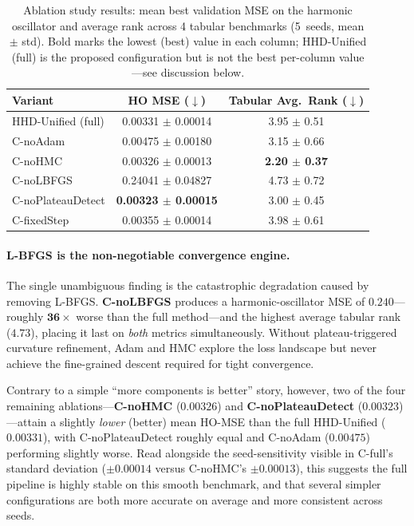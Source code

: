 \documentclass[11pt]{article}
\theoremstyle{definition}
\begin{document}
\begin{table}[H]
\centering
\caption{Ablation study results: mean best validation MSE on the
         harmonic oscillator and average rank across 4 tabular
         benchmarks (5~seeds, mean $\pm$ std).
         Bold marks the lowest (best) value in each column;
         HHD-Unified (full) is the proposed configuration but is not
         the best per-column value---see discussion below.}
\label{tab:ablation}
\renewcommand{\arraystretch}{1.25}
\begin{tabular}{lcc}
\toprule
\textbf{Variant} & \textbf{HO MSE} ($\downarrow$)
                 & \textbf{Tabular Avg.\ Rank} ($\downarrow$) \\
\midrule
HHD-Unified (full)       & 0.00331 $\pm$ 0.00014 & 3.95 $\pm$ 0.51 \\
C-noAdam                & 0.00475 $\pm$ 0.00180 & 3.15 $\pm$ 0.66 \\
C-noHMC                 & 0.00326 $\pm$ 0.00013 & \textbf{2.20 $\pm$ 0.37} \\
C-noLBFGS               & 0.24041 $\pm$ 0.04827 & 4.73 $\pm$ 0.72 \\
C-noPlateauDetect       & \textbf{0.00323 $\pm$ 0.00015} & 3.00 $\pm$ 0.45 \\
C-fixedStep             & 0.00355 $\pm$ 0.00014 & 3.98 $\pm$ 0.61 \\
\bottomrule
\end{tabular}
\end{table}


\paragraph{L-BFGS is the non-negotiable convergence engine.}
The single unambiguous finding is the catastrophic degradation
caused by removing L-BFGS\@. \textbf{C-noLBFGS} produces a
harmonic-oscillator MSE of $0.240$---roughly $\mathbf{36\times}$
worse than the full method---and the highest average tabular rank
($4.73$), placing it last on \emph{both} metrics simultaneously.
Without plateau-triggered curvature refinement, Adam and HMC
explore the loss landscape but never achieve the fine-grained
descent required for tight convergence.

Contrary to a simple ``more components is better'' story, however,
two of the four remaining ablations---\textbf{C-noHMC} ($0.00326$)
and \textbf{C-noPlateauDetect} ($0.00323$)---attain a slightly \emph{lower}
(better) mean HO-MSE than the full HHD-Unified ($0.00331$), with C-noPlateauDetect
roughly equal and C-noAdam ($0.00475$) performing slightly worse. Read
alongside the seed-sensitivity visible in C-full's standard
deviation ($\pm 0.00014$ versus C-noHMC's $\pm 0.00013$), this
suggests the full pipeline is highly stable on this smooth
benchmark, and that several simpler configurations are both more
accurate on average and more consistent across seeds.
\end{document}
